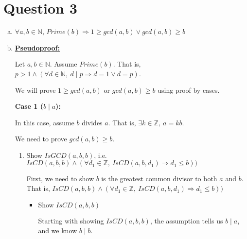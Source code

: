 \documentclass[12pt]{article}
\begin{document}
\section*{Question 3}
\begin{enumerate}[a.]
    \item $\forall a,b \in \mathbb{N}$, $Prime(b) \Rightarrow 1 \geq gcd(a,b) \lor gcd(a,b) \geq b$
    \item

    \bigskip

    \begin{mdframed}
        \underline{\textbf{Pseudoproof:}}

        \bigskip

        Let $a,b \in \mathbb{N}$. Assume $Prime(b)$. That is, $p > 1 \land (\forall
        d \in \mathbb{N},\:d \mid p \Rightarrow d = 1 \lor d = p)$.

        \bigskip

        We will prove $1 \geq gcd(a,b)$ or $gcd(a,b) \geq b$ using proof by cases.

        \bigskip

        \textbf{Case 1 ($b \mid a$):}

        \bigskip

        In this case, assume $b$ divides $a$. That is, $\exists k \in \mathbb{Z},\:a = kb$.

        \bigskip

        We need to prove $gcd(a,b) \geq b$.

        \bigskip

        \begin{enumerate}[1.]
            \item Show $IsGCD(a,b,b)$, i.e. $ IsCD(a,b,b) \land (\forall d_1 \in \mathbb{Z},\:IsCD(a,b,d_1) \Rightarrow d_1 \leq b))$

            \bigskip

            First, we need to show $b$ is the greatest common divisor to both $a$ and $b$. That is,
            $IsCD(a,b,b) \land (\forall d_1 \in \mathbb{Z},\:IsCD(a,b,d_1) \Rightarrow d_1 \leq b))$

            \bigskip

            \begin{itemize}
                \item Show $IsCD(a,b,b)$

                \bigskip

                \begin{mdframed}
                Starting with showing $IsCD(a,b,b)$, the assumption tells us
                $b \mid a$, and we know $b \mid b$.


\end{mdframed}
\end{itemize}
\end{enumerate}
\end{mdframed}
\end{enumerate}
\end{document}

